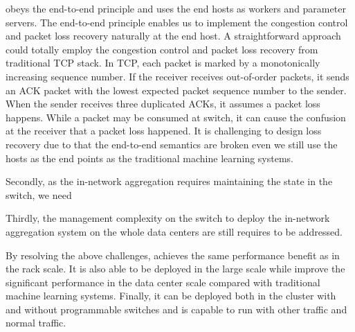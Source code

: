 \system obeys the end-to-end principle and uses the end hosts as workers and parameter servers. 
The end-to-end principle enables us to implement the congestion control and packet loss recovery 
naturally at the end host. A straightforward approach could totally employ 
the congestion control and packet loss recovery from traditional TCP stack.
In TCP, each packet is marked by a monotonically increasing sequence number. 
If the receiver receives out-of-order packets, it sends an ACK packet with the lowest 
expected packet sequence number to the sender. 
When the sender receives three duplicated ACKs, it assumes a packet loss happens.
While a packet may be consumed at switch, it can cause the confusion at the receiver
that a packet loss happened. It is challenging to design loss recovery due to that the end-to-end semantics are broken even we still use the hosts as the end points as the traditional machine learning systems. 
 
Secondly, as the in-network aggregation requires maintaining the state in the switch, 
we need 

Thirdly, the management complexity on the switch to deploy 
the in-network aggregation system on the whole data centers 
are still requires to be addressed.



By resolving the above challenges, \system achieves the same performance benefit 
as \switchml in the rack scale. 
It is also able to be deployed in the large scale while improve the significant 
performance in the data center scale compared with traditional machine learning systems. 
Finally, it can be deployed both in the cluster with and without 
programmable switches and is capable to run with other \system traffic and normal traffic. 

